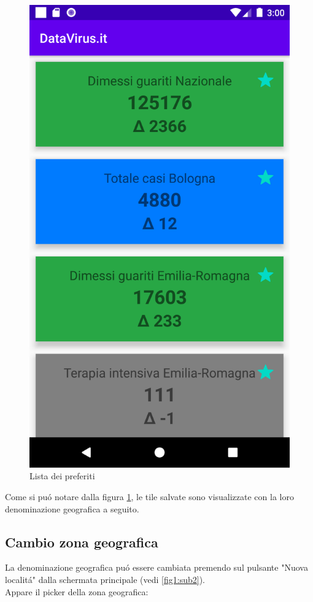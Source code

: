 \documentclass{article}
\begin{document}
    \begin{figure}[h]
        \centering
        \includegraphics[width=.5\linewidth]{preferences.png}
        \caption{Lista dei preferiti}
        \label{fig2}
    \end{figure}

    Come si puó notare dalla figura \ref{fig2}, le tile salvate sono visualizzate con la loro denominazione geografica a seguito.

    \subsection{Cambio zona geografica}
    La denominazione geografica puó essere cambiata premendo sul pulsante "Nuova localitá" dalla schermata principale (vedi \ref{fig1:sub2}).
    \\
    Appare il picker della zona geografica:
\end{document}
